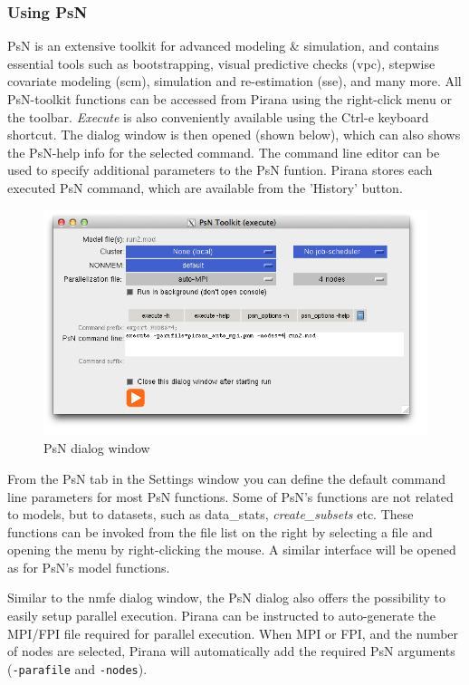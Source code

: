 {{\clearpage

\subsubsection{Using PsN}
PsN is an extensive toolkit for advanced modeling \& simulation, and
contains essential tools such as bootstrapping, visual predictive
checks (vpc), stepwise covariate modeling (scm), simulation and
re-estimation (sse), and many more. All PsN-toolkit functions can be
accessed from Pirana using the right-click menu or the toolbar. \textit{Execute} is
also conveniently available using the Ctrl-e keyboard shortcut. The
dialog window is then opened (shown below), which can also shows the
PsN-help info for the selected command. The command line editor can be
used to specify additional parameters to the PsN funtion. Pirana
stores each executed PsN command, which are available from the
'History' button.

\begin{figure}[H] \centering
    \includegraphics[scale=0.42]{images/Figure2_4_PsNdialog2.png}
    \caption{PsN dialog window}
\end{figure}

\noindent From the PsN tab in the Settings window you can define the default
command line parameters for most PsN functions. Some of PsN's functions are not related to models, but to datasets, such as data\_stats, \textit{create\_subsets} etc. These functions can be invoked from the file list on the right by selecting a file and opening the menu by right-clicking the mouse. A similar interface will be opened
as for PsN's model functions.

Similar to the nmfe dialog window, the PsN dialog also offers the possibility to
easily setup parallel execution. Pirana can be instructed to auto-generate
the MPI/FPI file required for parallel execution. When MPI or FPI, and the number of nodes are selected,
Pirana will automatically add the required PsN arguments ({\tt -parafile} and {\tt -nodes}).

}}

